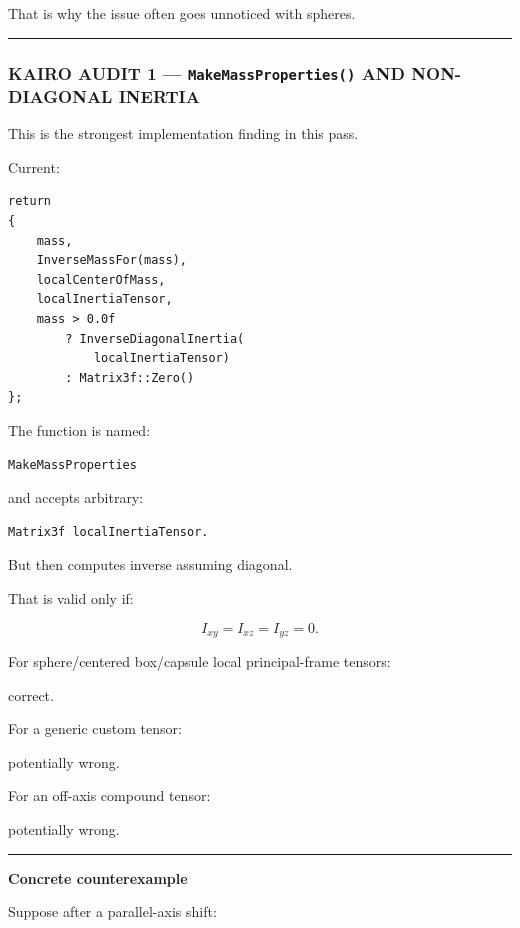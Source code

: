 That is why the issue often goes unnoticed with spheres.

\begin{center}\rule{0.5\linewidth}{0.5pt}\end{center}

\subsubsection{\texorpdfstring{KAIRO AUDIT 1 --- \texttt{MakeMassProperties()} AND NON-DIAGONAL INERTIA}{KAIRO AUDIT 1 --- MakeMassProperties() AND NON-DIAGONAL INERTIA}}\label{kairo-audit-1-makemassproperties-and-non-diagonal-inertia}

This is the strongest implementation finding in this pass.

Current:

\begin{verbatim}
return
{
    mass,
    InverseMassFor(mass),
    localCenterOfMass,
    localInertiaTensor,
    mass > 0.0f
        ? InverseDiagonalInertia(
            localInertiaTensor)
        : Matrix3f::Zero()
};
\end{verbatim}

The function is named:

\begin{verbatim}
MakeMassProperties
\end{verbatim}

and accepts arbitrary:

\begin{verbatim}
Matrix3f localInertiaTensor.
\end{verbatim}

But then computes inverse assuming diagonal.

That is valid only if:

\[
I_{xy}=I_{xz}=I_{yz}=0.
\]

For sphere/centered box/capsule local principal-frame tensors:

correct.

For a generic custom tensor:

potentially wrong.

For an off-axis compound tensor:

potentially wrong.

\begin{center}\rule{0.5\linewidth}{0.5pt}\end{center}

\textbf{Concrete counterexample}

Suppose after a parallel-axis shift:

